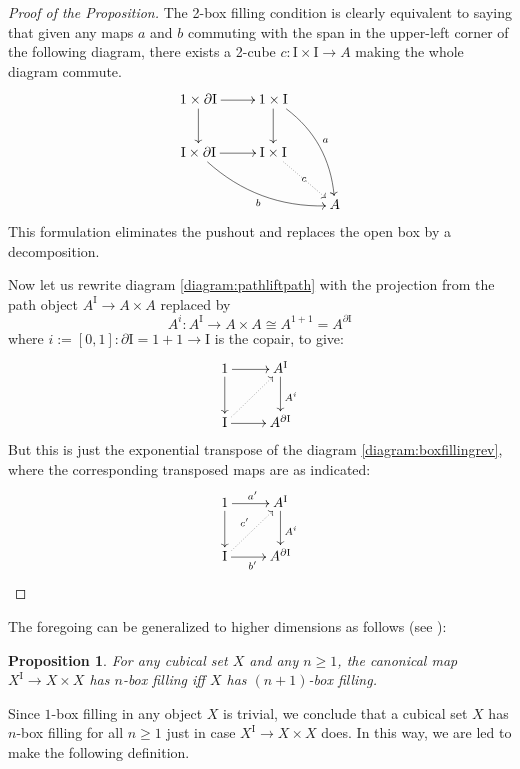 \documentclass[12pt]{article}
\newcommand{\I}{\ensuremath{\mathrm{I}}}
\newtheorem{proposition}[theorem]{Proposition}
\theoremstyle{remark}
\theoremstyle{definition}
\begin{document}
\begin{proof}[Proof of the Proposition]
The 2-box filling condition is clearly equivalent to saying that given any maps $a$ and $b$ commuting with the span in the upper-left corner of the following diagram, there exists a 2-cube $c :  \I\times\I \to A$  making the whole diagram commute.  
\begin{equation}\label{diagram:boxfillingrev}
\xymatrix{
1\times \partial\I \ar[d] \ar[r]  & 1\times \I \ar[d] \ar@/{}^{1pc}/[rdd]^{a} \\
\I \times \partial\I \ar[r] \ar@/{}_{1pc}/[rrd]_{b} & \I\times\I \ar@{.>}[rd]|{c} \\
 &&  A
}
\end{equation}
This formulation eliminates the pushout and replaces the open box by a decomposition.

Now let us rewrite diagram \eqref{diagram:pathliftpath} with the projection from the path object $A^\I \to A\times A$  replaced by
\[
A^i : A^\I \to A\times A \cong A^{1+1} = A^{\partial\I} 
\] 
where $i := [0,1] : \partial \I = 1+1 \to \I$ is the copair, to give:
\begin{equation*}\label{diagram:pathliftpathrev}
\xymatrix{
1 \ar[d] \ar[r] & A^\I \ar[d]^{A^i} \\
\I \ar[r] \ar@{..>}[ru] & A^{\partial\I}
}
\end{equation*}
But this is just the exponential transpose of the diagram \eqref{diagram:boxfillingrev}, where the corresponding transposed maps are as indicated:
\begin{equation}\label{diagram:pathliftpathrev}
\xymatrix{
1 \ar[d] \ar[r]^{a'} & A^\I \ar[d]^{A^i} \\
\I \ar[r]_{b'} \ar@{..>}[ru]^{c'} & A^{\partial\I}
}
\end{equation}
\end{proof}

The foregoing can be generalized to higher dimensions as follows (see \cite{awodey:cubes}):

\begin{proposition}\label{prop:main}
For any cubical set $X$ and any $n\geq 1$,  the canonical map $X^\I \to X\times X$ has $n$-box filling iff $X$ has $(n+1)$-box filling.
\end{proposition}

Since $1$-box filling in any object $X$ is trivial, we conclude that a cubical set $X$ has $n$-box filling for all $n\geq 1$ just in case $X^\I \to X\times X$ does.  In this way, we are led to make the following definition.
\end{document}
